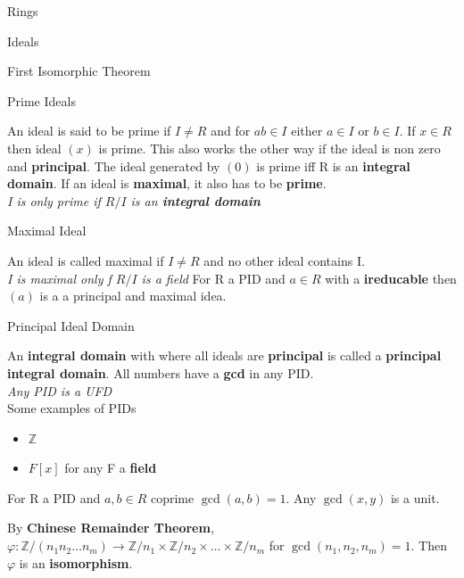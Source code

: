 \documentclass[12pt, letterpaper]{article}
\begin{document}
\begin{section}{Rings}
\begin{subsection}{Ideals}
\begin{subsubsection}{First Isomorphic Theorem}
    \end{subsubsection}

    \begin{subsubsection}{Prime Ideals}

      An ideal is said to be prime if \(I \neq R\) and for \(ab \in I\) either
      \(a \in I\) or \(b \in I\). If \(x \in R\) then ideal \((x)\) is prime.
      This also works the other way if the ideal is non zero and \textbf{principal}.
      The ideal generated by \((0)\) is prime iff R is an \textbf{integral domain}.
      If an ideal is \textbf{maximal}, it also has to be \textbf{prime}.\\
      \emph{I is only prime if \(R/I\) is an \textbf{integral domain}}

    \end{subsubsection}

    \begin{subsubsection}{Maximal Ideal}

      An ideal is called maximal if \(I \neq R\) and no other ideal contains I. \\
      \emph{I is maximal only f \(R/I\) is a field} For R a PID and \(a \in R\)
      with a \textbf{ireducable} then \((a)\) is a a principal and maximal idea.


    \end{subsubsection}

  \end{subsection}

  \begin{subsection}{Principal Ideal Domain}

    An \textbf{integral domain} with where all ideals are \textbf{principal}
    is called a \textbf{principal integral domain}. All numbers have a \textbf{gcd}
    in any PID.\\
    \emph{Any PID is a UFD} \\

    Some examples of PIDs
    \begin{itemize}
      \item \(\mathbb{Z}\)
      \item \(F[x]\) for any F a \textbf{field}
    \end{itemize}

    For R a PID and \(a, b \in R\) coprime \(\gcd(a, b) = 1\). Any
    \(\gcd(x, y)\) is a unit.

    By \textbf{Chinese Remainder Theorem},
    \(\varphi: \mathbb{Z}/(n_{1}n_{2} \dots n_{m}) \to \mathbb{Z}/n_{1} \times
    \mathbb{Z}/n_{2} \times \dots \times \mathbb{Z}/n_{m}\) for
    \(\gcd(n_{1}, n_{2}, n_{m}) = 1\). Then \(\varphi\) is an \textbf{isomorphism}.


  \end{subsection}

\end{section}
\end{document}
